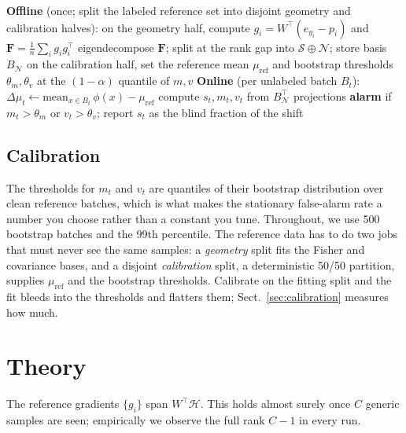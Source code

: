 \documentclass[graybox]{SNmult}
\newcommand{\F}{\mathbf{F}}
\newcommand{\act}{\phi}
\begin{document}
\begin{algorithm}[t]
\caption{FEATHER}
\label{alg:feather}
\begin{algorithmic}[1]
\Statex \textbf{Offline} (once; split the labeled reference set into disjoint
       geometry and calibration halves):
\State on the geometry half, compute $g_i = W^\top(e_{y_i} - p_i)$ and
       $\F = \frac{1}{n}\sum_i g_i g_i^\top$
\State eigendecompose $\F$; split at the rank gap into
       $\mathcal{S} \oplus \mathcal{N}$; store basis $B_\mathcal{N}$
\State on the calibration half, set the reference mean $\mu_{\mathrm{ref}}$ and
       bootstrap thresholds $\theta_m, \theta_v$ at the $(1-\alpha)$ quantile
       of $m, v$
\Statex \textbf{Online} (per unlabeled batch $B_t$):
\State $\Delta\mu_t \gets \mathrm{mean}_{x \in B_t}\,\act(x) - \mu_{\mathrm{ref}}$
\State compute $s_t, m_t, v_t$ from $B_\mathcal{N}^\top$ projections
\State \textbf{alarm} if $m_t > \theta_m$ or $v_t > \theta_v$;
       report $s_t$ as the blind fraction of the shift
\end{algorithmic}
\end{algorithm}

\subsection{Calibration}

The thresholds for $m_t$ and $v_t$ are quantiles of their bootstrap
distribution over clean reference batches, which is what makes the stationary
false-alarm rate a number you choose rather than a constant you tune.
Throughout, we use 500 bootstrap batches and the 99th percentile. The
reference data has to do two jobs that must never see the same samples: a
\emph{geometry} split fits the Fisher and covariance bases, and a disjoint
\emph{calibration} split, a deterministic 50/50 partition, supplies
$\mu_{\mathrm{ref}}$ and the bootstrap thresholds. Calibrate on the fitting
split and the fit bleeds into the thresholds and flatters them;
Sect.~\ref{sec:calibration} measures how much.

\section{Theory}
\label{sec:theory}

\begin{assumption}
\label{ass:span}
The reference gradients $\{g_i\}$ span $W^\top\!\mathcal{H}$. This holds
almost surely once $C$ generic samples are seen; empirically we observe the
full rank $C-1$ in every run.
\end{assumption}
\end{document}
